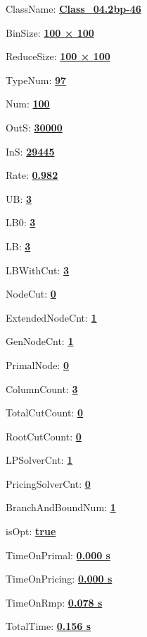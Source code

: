 \documentclass[11pt]{article}
\begin{document}
\pagestyle{empty}


ClassName: \underline{\textbf{Class_04.2bp-46}}
\par
BinSize: \underline{\textbf{100 × 100}}
\par
ReduceSize: \underline{\textbf{100 × 100}}
\par
TypeNum: \underline{\textbf{97}}
\par
Num: \underline{\textbf{100}}
\par
OutS: \underline{\textbf{30000}}
\par
InS: \underline{\textbf{29445}}
\par
Rate: \underline{\textbf{0.982}}
\par
UB: \underline{\textbf{3}}
\par
LB0: \underline{\textbf{3}}
\par
LB: \underline{\textbf{3}}
\par
LBWithCut: \underline{\textbf{3}}
\par
NodeCut: \underline{\textbf{0}}
\par
ExtendedNodeCnt: \underline{\textbf{1}}
\par
GenNodeCnt: \underline{\textbf{1}}
\par
PrimalNode: \underline{\textbf{0}}
\par
ColumnCount: \underline{\textbf{3}}
\par
TotalCutCount: \underline{\textbf{0}}
\par
RootCutCount: \underline{\textbf{0}}
\par
LPSolverCnt: \underline{\textbf{1}}
\par
PricingSolverCnt: \underline{\textbf{0}}
\par
BranchAndBoundNum: \underline{\textbf{1}}
\par
isOpt: \underline{\textbf{true}}
\par
TimeOnPrimal: \underline{\textbf{0.000 s}}
\par
TimeOnPricing: \underline{\textbf{0.000 s}}
\par
TimeOnRmp: \underline{\textbf{0.078 s}}
\par
TotalTime: \underline{\textbf{0.156 s}}
\par
\newpage
\end{document}
